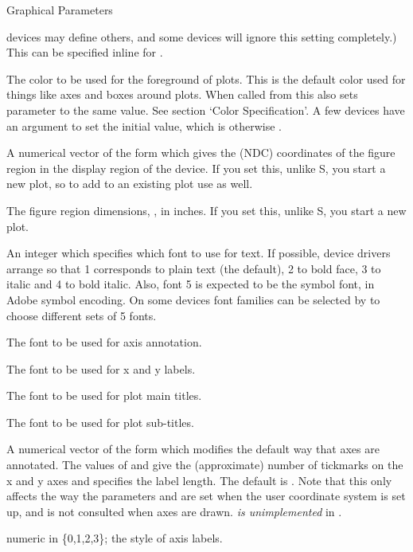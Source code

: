 \begin{Section}{Graphical Parameters}
\begin{description}
devices may define others, and some devices will ignore this
setting completely.)  This can be specified inline for
.
\item[\code{fg}] The color to be used for the foreground of plots.
This is the default color used for things like axes and boxes
around plots.  When called from  this also sets
parameter  to the same value.  See section `Color
Specification'.  A few devices have an argument to set the
initial value, which is otherwise .
\item[\code{fig}] A numerical vector of the form  which gives the (NDC) coordinates of the figure region in
the display region of the device. If you set this, unlike S, you
start a new plot, so to add to an existing plot use
 as well.
\item[\code{fin}] The figure region dimensions,
, in inches. If you set this, unlike S, you
start a new plot.
\item[\code{font}] An integer which specifies which font to use for
text.  If possible, device drivers arrange so that 1 corresponds
to plain text (the default), 2 to bold face, 3 to italic and 4 to
bold italic.  Also, font 5 is expected to be the symbol font, in
Adobe symbol encoding.  On some devices font families can be
selected by  to choose different sets of 5 fonts.
\item[\code{font.axis}] The font to be used for axis annotation.
\item[\code{font.lab}] The font to be used for x and y labels.
\item[\code{font.main}] The font to be used for plot main titles.
\item[\code{font.sub}] The font to be used for plot sub-titles.
\item[\code{lab}] A numerical vector of the form 
which modifies the default way that axes are annotated.  The values of
 and  give the (approximate) number of tickmarks
on the x and y axes and  specifies the label length.  The
default is .  Note that this only affects the way
the parameters  and  are set when the user
coordinate system is set up, and is not consulted when axes are drawn.
 \emph{is unimplemented} in \R{}.
\item[\code{las}] numeric in \{0,1,2,3\}; the style of axis labels.
\begin{description}


\end{description}
\end{description}
\end{Section}
